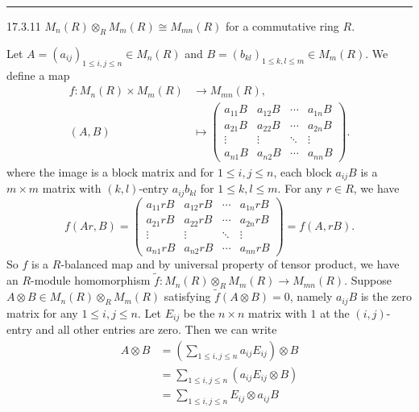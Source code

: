 \documentclass[a4paper, 12pt]{article}
\begin{document}
\noindent\rule{7in}{2.8pt}
\begin{problem}{17.3.11}
\(M_n(R)\otimes_R M_m(R)\cong M_{mn}(R)\) for a commutative ring \(R\).
\end{problem}
\begin{solution}
Let \(A=(a_{ij})_{1\leq i,j\leq n}\in M_n(R)\) and \(B=(b_{kl})_{1\leq k,l\leq m}\in M_m(R)\). We define a map 
\begin{align*}
	f:M_n(R)\times M_m(R)&\rightarrow M_{mn}(R),\\ 
	  (A,B)&\mapsto \begin{pmatrix}
		a_{11}B&a_{12}B&\cdots&a_{1n}B\\ 
		a_{21}B&a_{22}B&\cdots&a_{2n}B\\ 
		\vdots&\vdots&\ddots&\vdots\\ 
		a_{n1}B&a_{n2}B&\cdots&a_{nn}B
	  \end{pmatrix}.
\end{align*}
where the image is a block matrix and for \(1\leq i,j\leq n\), each block \(a_{ij}B\) is a \(m\times m\) matrix with \((k,l)\)-entry \(a_{ij}b_{kl}\) for \(1\leq k,l\leq m\). For any \(r\in R\), we have 
\[f(Ar,B)=\begin{pmatrix}
	a_{11}rB&a_{12}rB&\cdots&a_{1n}rB\\ 
	a_{21}rB&a_{22}rB&\cdots&a_{2n}rB\\ 
	\vdots&\vdots&\ddots&\vdots\\ 
	a_{n1}rB&a_{n2}rB&\cdots&a_{nn}rB
\end{pmatrix}=f(A,rB).\]
So \(f\) is a \(R\)-balanced map and by universal property of tensor product, we have an \(R\)-module homomorphism \(\tilde{f}:M_n(R)\otimes_R M_m(R)\rightarrow M_{mn}(R)\). Suppose \(A\otimes B\in M_n(R)\otimes_R M_m(R)\) satisfying \(\tilde{f}(A\otimes B)=0\), namely 
\(a_{ij}B\) is the zero matrix for any \(1\leq i,j\leq n\). Let \(E_{ij}\) be the \(n\times n\) matrix with \(1\) at the \((i,j)\)-entry and all other entries are zero. Then we can write 
\begin{align*}
A\otimes B&=(\sum_{1\leq i,j\leq n}a_{ij}E_{ij})\otimes B\\ 
          &=\sum_{1\leq i,j\leq n}(a_{ij}E_{ij}\otimes B)\\ 
		  &=\sum_{1\leq i,j\leq n}E_{ij}\otimes a_{ij}B\\ 

\end{align*}
\end{solution}
\end{document}
